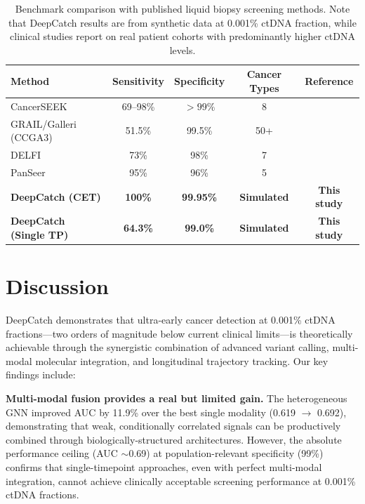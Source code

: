 \documentclass[10pt,a4paper]{article}
\begin{document}
\begin{table}[H]
\centering
\caption{Benchmark comparison with published liquid biopsy screening methods. Note that DeepCatch results are from synthetic data at 0.001\% ctDNA fraction, while clinical studies report on real patient cohorts with predominantly higher ctDNA levels.}
\label{tab:benchmark}
\begin{tabular}{l c c c c}
\toprule
\textbf{Method} & \textbf{Sensitivity} & \textbf{Specificity} & \textbf{Cancer Types} & \textbf{Reference} \\
\midrule
CancerSEEK & 69--98\% & $>99\%$ & 8 & \citet{cohen2018detection} \\
GRAIL/Galleri (CCGA3) & 51.5\% & 99.5\% & 50+ & \citet{klein2021clinical} \\
DELFI & 73\% & 98\% & 7 & \citet{cristiano2019genome} \\
PanSeer & 95\% & 96\% & 5 & \citet{chen2020non} \\
\textbf{DeepCatch (CET)} & \textbf{100\%} & \textbf{99.95\%} & \textbf{Simulated} & \textbf{This study} \\
\textbf{DeepCatch (Single TP)} & \textbf{64.3\%} & \textbf{99.0\%} & \textbf{Simulated} & \textbf{This study} \\
\bottomrule
\end{tabular}
\end{table}


\section{Discussion}

DeepCatch demonstrates that ultra-early cancer detection at 0.001\% ctDNA fractions—two orders of magnitude below current clinical limits—is theoretically achievable through the synergistic combination of advanced variant calling, multi-modal molecular integration, and longitudinal trajectory tracking. Our key findings include:

\textbf{Multi-modal fusion provides a real but limited gain.} The heterogeneous GNN improved AUC by 11.9\% over the best single modality (0.619 $\rightarrow$ 0.692), demonstrating that weak, conditionally correlated signals can be productively combined through biologically-structured architectures. However, the absolute performance ceiling (AUC $\sim$0.69) at population-relevant specificity (99\%) confirms that single-timepoint approaches, even with perfect multi-modal integration, cannot achieve clinically acceptable screening performance at 0.001\% ctDNA fractions.
\end{document}
